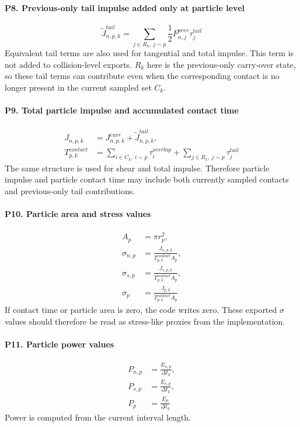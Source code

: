 \documentclass[11pt,a4paper]{article}
\begin{document}
\paragraph{P8. Previous-only tail impulse added only at particle level}
\[
\widetilde{J}_{n,p,k}^{tail} = \sum_{j \in R_k,\ j \sim p} \frac{1}{2}F_{n,j}^{prev}\tau_j^{tail}
\]
Equivalent tail terms are also used for tangential and total impulse. This term is not added to collision-level exports.
$R_k$ here is the previous-only carry-over state, so these tail terms can contribute even when the corresponding contact is no longer present in the current sampled set $C_k$.

\paragraph{P9. Total particle impulse and accumulated contact time}
\[
\begin{aligned}
J_{n,p,k} &= J_{n,p,k}^{curr} + \widetilde{J}_{n,p,k}^{tail}, \\
T_{p,k}^{contact} &= \sum_{i \in C_k,\ i \sim p}\tau_i^{overlap} + \sum_{j \in R_k,\ j \sim p}\tau_j^{tail}
\end{aligned}
\]
The same structure is used for shear and total impulse.
Therefore particle impulse and particle contact time may include both currently sampled contacts and previous-only tail contributions.

\paragraph{P10. Particle area and stress values}
\[
\begin{aligned}
A_p &= \pi r_p^2, \\
\sigma_{n,p} &= \frac{J_{n,p,k}}{T_{p,k}^{contact} A_p}, \\
\sigma_{s,p} &= \frac{J_{s,p,k}}{T_{p,k}^{contact} A_p}, \\
\sigma_p &= \frac{J_{p,k}}{T_{p,k}^{contact} A_p}
\end{aligned}
\]
If contact time or particle area is zero, the code writes zero.
These exported $\sigma$ values should therefore be read as stress-like proxies from the implementation.

\paragraph{P11. Particle power values}
\[
\begin{aligned}
P_{n,p} &= \frac{E_{n,p}}{\Delta t_k}, \\
P_{s,p} &= \frac{E_{s,p}}{\Delta t_k}, \\
P_p &= \frac{E_p}{\Delta t_k}
\end{aligned}
\]
Power is computed from the current interval length.
\end{document}
